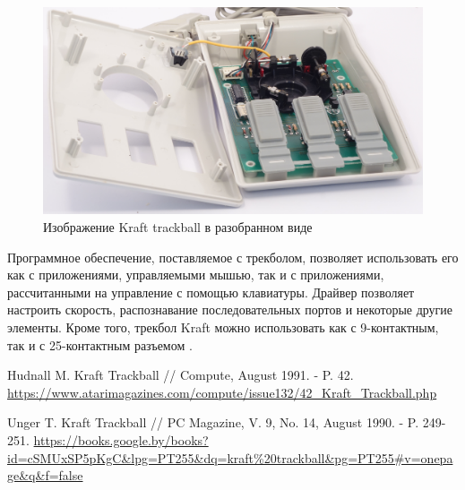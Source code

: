 \documentclass[11pt, a4paper]{article}
\begin{document}
\begin{figure}[h]
    \centering
    \includegraphics[scale=0.6]{1989_kraft_trackball/6.2.jpg}
    \caption{Изображение Kraft trackball в разобранном виде}
    \label{fig:KraftInside}
\end{figure}

Программное обеспечение, поставляемое с трекболом, позволяет использовать его как с приложениями, управляемыми мышью, так и с приложениями, рассчитанными на управление с помощью клавиатуры. Драйвер позволяет настроить скорость, распознавание последовательных портов и некоторые другие элементы. Кроме того, трекбол Kraft можно использовать как с 9-контактным, так и с 25-контактным разъемом \cite{Hudnall}.

\begin{thebibliography}{9}
 Hudnall M. Kraft Trackball // Compute, August 1991. - P. 42. \url{https://www.atarimagazines.com/compute/issue132/42_Kraft_Trackball.php}

 Unger T. Kraft Trackball // PC Magazine, V. 9, No. 14, August 1990. - P. 249-251. \url{https://books.google.by/books?id=cSMUxSP5pKgC&lpg=PT255&dq=kraft%20trackball&pg=PT255#v=onepage&q&f=false}
\end{thebibliography}
\end{document}
